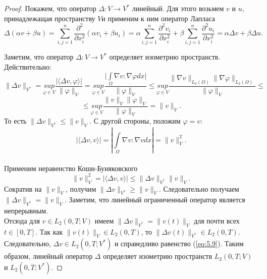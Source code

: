 \begin{proof}
        Покажем, что оператор $\Delta : V\rightarrow V^*$ линейный. 
        Для этого возьмем $v$ и $u$, принадлежащая пространству $V$и применим к ним оператор Лапласа
        $$\Delta (\alpha v+\beta u)= \sum_{i,j=1}^{n} \frac{\partial^2}{\partial x_i^2} (\alpha v_i+\beta u_i)=
        \alpha \sum_{i,j=1}^{n} \frac{\partial^2 v_i}{\partial x_i^2}+\beta \sum_{i,j=1}^{n} \frac{\partial^2 u_i}{\partial x_i^2}=\alpha\Delta v+\beta\Delta u.$$
        

        Заметим, что оператор $\Delta : V\rightarrow V^*$ определяет изометрию пространств. Действительно:
        $$\| \Delta v \|_{V^*}=\underset{\varphi\in V}{sup} \frac{|\langle \Delta v,\varphi \rangle|}{\| \varphi\|_V}=\underset{\varphi\in V}{sup} 
        \frac{\bigg|\int\limits_{\Omega}\nabla v:\nabla\varphi dx\bigg|}{\| \varphi\|_V}\le
        \underset{\varphi\in V}{sup} \frac{\|\nabla v\|_{L_2(\Omega)}\|\nabla \varphi\|_{L_2(\Omega)}}{\|\varphi\|_V}\le$$
        $$\le\underset{\varphi\in V}{sup} \frac{\| v \|_{V} \| \varphi \|_{V}}{\| \varphi \|_{V}}=\| v \|_{V}.$$
        То есть $\| \Delta v \|_{V^*}\le\| v \|_{V}.$ С другой стороны, положим $\varphi=v:$\\
        $$|\langle \Delta v,v \rangle|=|\int\limits_{\Omega}\nabla v:\nabla v dx|=\|v\|_V^2.$$\\
        Применим неравенство Коши-Буняковского
        $$\|v\|_V^2=|\langle \Delta v,v\rangle|\le\|\Delta v\|_{V^*}\| v\|_{V}.$$
        Сократив на $\|v\|_V$, получим $\|\Delta v\|_{V^*}\ge\|v\|_V.$
        Следовательно получаем $\|\Delta v\|_{V^*}=\|v\|_V.$
        Заметим, что линейный ограниченный оператор является непрерывным.\\
        Отсюда для $v \in L_2(0, T; V)$ имеем
        $\| \Delta v \|_{V^\ast} = \| v(t) \|_V$ для почти всех\linebreak$t \in [0, T]$. Так как $\| v(t) \|_V \in L_2(0, T)$,
        то $\| \Delta v(t)\|_{V^*} \in L_2(0, T)$. Следовательно, $\Delta v \in L_2(0, T; V^\ast)$ и справедливо
        равенство (\ref{eq:5.9}). Таким образом, линейный оператор $\Delta$ определяет изометрию пространств $L_2(0, T; V)$ и $L_2(0, T; V^\ast)$.
        

\end{proof}
